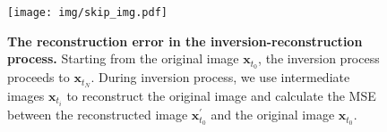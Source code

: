 \begin{figure}[t]
    \centering
    \texttt{[image: img/skip\_img.pdf]}
    \caption{\textbf{The reconstruction error in the inversion-reconstruction process.} Starting from the original image $\mathbf{x}_{t_0}$, the inversion process proceeds to $\mathbf{x}_{t_N}$. During inversion process, we use intermediate images $\mathbf{x}_{t_i}$ to reconstruct the original image and calculate the MSE between the reconstructed image $\mathbf{x}_{t_0}^{\prime}$ and the original image $\mathbf{x}_{t_0}$.}
    \label{fig:skip}
    \vspace{-10pt}
\end{figure}

